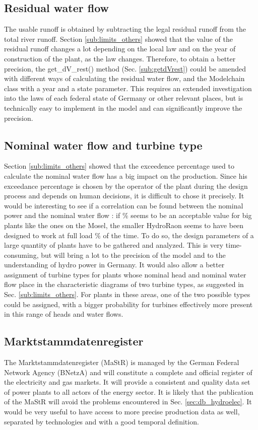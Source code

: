 \subsection{Residual water flow}
\label{sub:imp_dVrest}
The usable runoff is obtained by subtracting the legal residual runoff from the total river runoff. Section \ref{sub:limits_others} showed that the value of the residual runoff changes a lot depending on the local law and on the year of construction of the plant, as the law changes. Therefore, to obtain a better precision, the get{\_}dV{\_}rest() method (Sec. \ref{sub:getdVrest}) could be amended with different ways of calculating the residual water flow, and the Modelchain class with a year and a state parameter. \newline
This requires an extended investigation into the laws of each federal state of Germany or other relevant places, but is technically easy to implement in the model and can significantly improve the precision.

\subsection{Nominal water flow and turbine type}
\label{sub:imp_dVn}
Section \ref{sub:limits_others} showed that the exceedence percentage used to calculate the nominal water flow has a big impact on the production. Since his exceedance percentage is chosen by the operator of the plant during the design process and depends on human decisions, it is difficult to chose it precisely. It would be interesting to see if a correlation can be found between the nominal power and the nominal water flow : if \unit[20]{\%} seems to be an acceptable value for big plants like the ones on the Mosel, the smaller HydroRaon seems to have been designed to work at full load \unit[30]{\%} of the time. To do so, the design parameters of a large quantity of plants have to be gathered and analyzed. This is very time-consuming, but will bring a lot to the precision of the model and to the understanding of hydro power in Germany. \newline
It would also allow a better assignment of turbine types for plants whose nominal head and nominal water flow place in the characteristic diagrams of two turbine types, as suggested in Sec. \ref{sub:limits_others}. For plants in these areas, one of the two possible types could be assigned, with a bigger probability for turbines effectively more present in this range of heads and water flows.

\subsection{Marktstammdatenregister}
\label{sub:imp_data}
The Marktstammdatenregister (MaStR) is managed by the German Federal Network Agency (BNetzA) and will constitute a complete and official register of the electricity and gas markets. It will provide a consistent and quality data set of power plants to all actors of the energy sector. It is likely that the publication of the MaStR will avoid the problems encountered in Sec. \ref{sec:db_hydroelec}. It would be very useful to have access to more precise production data as well, separated by technologies and with a good temporal definition.

